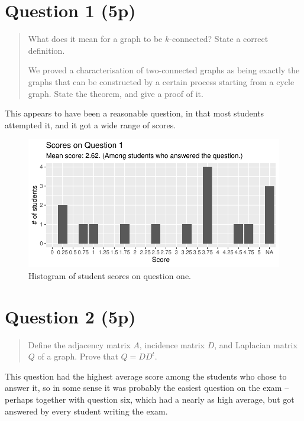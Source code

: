 \documentclass[nobib]{tufte-handout}
\begin{document}
\section{Question 1 (5p)} %

\begin{quotation}
  What does it mean for a graph to be $k$-connected? State a correct definition.

  We proved a characterisation of two-connected graphs as being exactly the graphs that can be constructed by a certain process starting from a cycle graph. State the theorem, and give a proof of it.
\end{quotation}

This appears to have been a reasonable question, in that most students attempted it, and it got a wide range of scores.

\begin{figure}[p]
  \centering
  \includegraphics[width = \textwidth]{Q1.pdf}
  \caption[Score histogram for Q1]{Histogram of student scores on question one.}
  \label{fig:Q1}
\end{figure}

\section{Question 2 (5p)} %

\begin{quotation}
  Define the adjacency matrix $A$, incidence matrix $D$, and Laplacian matrix $Q$ of a graph. Prove that $Q = DD^t$.
\end{quotation}

This question had the highest average score among the students who chose to answer it, so in some sense it was probably the easiest question on the exam -- perhaps together with question six, which had a nearly as high average, but got answered by every student writing the exam.
\end{document}
